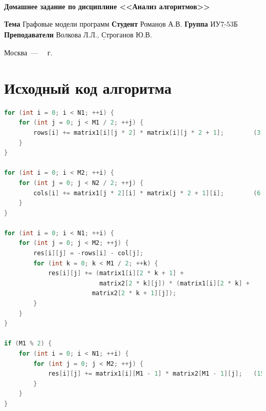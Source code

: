\documentclass[12pt]{report}
\begin{document}
\begin{titlepage}
	
	\begin{center}
		\noindent\begin{minipage}{1.3\textwidth}\centering
			\Large\textbf{  Домашнее задание по }\newline
			\textbf{ дисциплине <<Анализ алгоритмов>>}\newline\newline
		\end{minipage}
	\end{center}
	
	\noindent\textbf{Тема} $\underline{\text{Графовые модели программ}}$\newline\newline
	\noindent\textbf{Студент} $\underline{\text{Романов А.В.}}$\newline\newline
	\noindent\textbf{Группа} $\underline{\text{ИУ7-53Б}}$\newline\newline
	\noindent\textbf{Преподаватели} $\underline{\text{Волкова Л.Л., Строганов Ю.В.}}$\newline\newline\newline
	
	\begin{center}
		\vfill
		Москва~---~\the\year
		~г.
	\end{center}
\end{titlepage}


\tableofcontents

\newpage
\chapter{Исходный код алгоритма}

\begin{lstlisting}[label=some-code,caption=Функция умножения матриц по Винограду, language=C]
for (int i = 0; i < N1; ++i) {															(1)
	for (int j = 0; j < M1 / 2; ++j) {												(2)
		rows[i] += matrix1[i][j * 2] * matrix[i][j * 2 + 1]; 		(3)
	}
}

for (int i = 0; i < M2; ++i) {															(4)
	for (int j = 0; j < N2 / 2; ++j) {												(5)
		cols[i] += matrix1[j * 2][i] * matrix[j * 2 + 1][i];		(6)
	}
}

for (int i = 0; i < N1; ++i) {															(7)
	for (int j = 0; j < M2; ++j) {														(8)
		res[i][j] = -rows[i] - col[j];											  	(9)
		for (int k = 0; k < M1 / 2; ++k) {											(10)
			res[i][j] += (matrix1[i][2 * k + 1] +
			 			  matrix2[2 * k][j]) * (matrix1[i][2 * k] +
			  			matrix2[2 * k + 1][j]);												(11)
		}
	}
}

if (M1 % 2) {																								(12)
	for (int i = 0; i < N1; ++i) {														(13)
		for (int j = 0; j < M2; ++j) {													(14)
			res[i][j] += matrix1[i][M1 - 1] * matrix2[M1 - 1][j];	(15)
		}
	}
}
\end{lstlisting}
\end{document}
